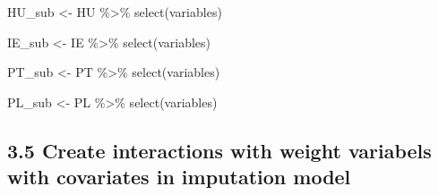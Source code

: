 \documentclass[
]{article}
\newenvironment{Shaded}{\begin{snugshade}}{\end{snugshade}}
\newcommand{\FunctionTok}[1]{\textcolor[rgb]{0.00,0.00,0.00}{#1}}
\newcommand{\NormalTok}[1]{#1}
\newcommand{\OtherTok}[1]{\textcolor[rgb]{0.56,0.35,0.01}{#1}}
\newcommand{\SpecialCharTok}[1]{\textcolor[rgb]{0.00,0.00,0.00}{#1}}
\begin{document}
\begin{Shaded}
\begin{Highlighting}[]
\NormalTok{HU\_sub }\OtherTok{\textless{}{-}}\NormalTok{ HU }\SpecialCharTok{\%\textgreater{}\%} \FunctionTok{select}\NormalTok{(variables)}

\NormalTok{IE\_sub }\OtherTok{\textless{}{-}}\NormalTok{ IE }\SpecialCharTok{\%\textgreater{}\%} \FunctionTok{select}\NormalTok{(variables)}

\NormalTok{PT\_sub }\OtherTok{\textless{}{-}}\NormalTok{ PT }\SpecialCharTok{\%\textgreater{}\%} \FunctionTok{select}\NormalTok{(variables)}

\NormalTok{PL\_sub }\OtherTok{\textless{}{-}}\NormalTok{ PL }\SpecialCharTok{\%\textgreater{}\%} \FunctionTok{select}\NormalTok{(variables)}
\end{Highlighting}
\end{Shaded}

\hypertarget{create-interactions-with-weight-variabels-with-covariates-in-imputation-model}{%
\subsection{3.5 Create interactions with weight variabels with
covariates in imputation
model}\label{create-interactions-with-weight-variabels-with-covariates-in-imputation-model}}
\end{document}
